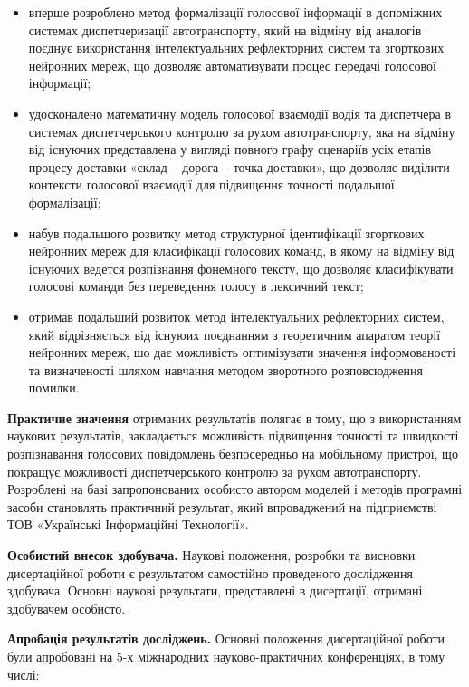 \begin{itemize}
	\item вперше розроблено метод формалізації голосової інформації в допоміжних системах диспетчеризації автотранспорту, який на відміну від аналогів поєднує використання інтелектуальних рефлекторних систем та згорткових нейронних мереж, що дозволяє автоматизувати процес передачі голосової інформації;
	\item удосконалено математичну модель голосової взаємодії водія та диспетчера в системах диспетчерського контролю за рухом автотранспорту, яка на відміну від існуючих представлена у вигляді повного графу сценаріїв усіх етапів процесу доставки «склад – дорога – точка доставки», що дозволяє виділити контексти голосової взаємодії для підвищення точності подальшої формалізації;
	\item набув подальшого розвитку метод структурної ідентифікації згорткових нейронних мереж для класифікації голосових команд, в якому на відміну від існуючих ведется розпізнання фонемного тексту, що дозволяє класифікувати голосові команди без переведення голосу в лексичний текст;
	\item отримав подальший розвиток метод інтелектуальних рефлекторних систем, який відрізняється від існуюих поєднанням з теоретичним апаратом теорії нейронних мереж, шо дає можливість оптимізувати значення інформованості та визначеності шляхом навчання методом зворотного розповсюдження помилки.
\end{itemize}

\textbf{Практичне значення} отриманих результатів полягає в тому, що з використанням наукових результатів, закладається можливість підвищення точності та швидкості розпізнавання голосових повідомлень безпосередньо на мобільному пристрої, що покращує можливості диспетчерського контролю за рухом автотранспорту. Розроблені на базі запропонованих особисто автором моделей і методів програмні засоби становлять практичний результат, який впроваджений на підприємстві ТОВ «Українські Інформаційні Технології».

\textbf{Особистий внесок здобувача.} Наукові положення, розробки та висновки дисертаційної роботи є результатом самостійно проведеного дослідження здобувача. Основні наукові результати, представлені в дисертації, отримані здобувачем особисто.

\textbf{Апробація результатів досліджень.} Основні положення дисертаційної роботи були апробовані на 5-х міжнародних науково-практичних конференціях, в тому числі:

